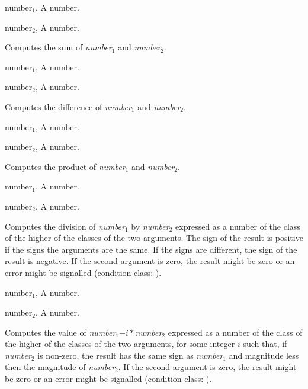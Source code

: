 \begin{optDefinition}
%
\begin{genericargs}
    \item[number$_1$, \classref{number}] A number.
    \item[number$_2$, \classref{number}] A number.
\end{genericargs}
%
\result%
Computes the sum of {\em number$_1$} and {\em number$_2$}.

\begin{genericargs}
    \item[number$_1$, \classref{number}] A number.
    \item[number$_2$, \classref{number}] A number.
\end{genericargs}
%
\result%
Computes the difference of {\em number$_1$} and {\em number$_2$}.

%
\begin{genericargs}
    \item[number$_1$, \classref{number}] A number.
    \item[number$_2$, \classref{number}] A number.
\end{genericargs}
%
\result%
Computes the product of {\em number$_1$} and {\em number$_2$}.

%
\begin{genericargs}
    \item[number$_1$, \classref{number}] A number.
    \item[number$_2$, \classref{number}] A number.
\end{genericargs}
%
\result%
Computes the division of {\em number$_1$} by {\em number$_2$} expressed as a
number of the class of the higher of the classes of the two arguments.  The sign
of the result is positive if the signs the arguments are the same.  If the signs
are different, the sign of the result is negative.  If the second argument is
zero, the result might be zero or an error might be signalled (condition class:
).

%
\begin{genericargs}
    \item[number$_1$, \classref{number}] A number.
    \item[number$_2$, \classref{number}] A number.
\end{genericargs}
%
\result%
Computes the value of {\em{}number$_1$}$-i*${\em{}number$_2$} expressed as a
number of the class of the higher of the classes of the two arguments, for some
integer $i$ such that, if {\em number$_2$} is non-zero, the result has the same
sign as {\em number$_1$} and magnitude less then the magnitude of {\em
    number$_2$}.  If the second argument is zero, the result might be zero or an
error might be signalled (condition class:
).


\end{optDefinition}
